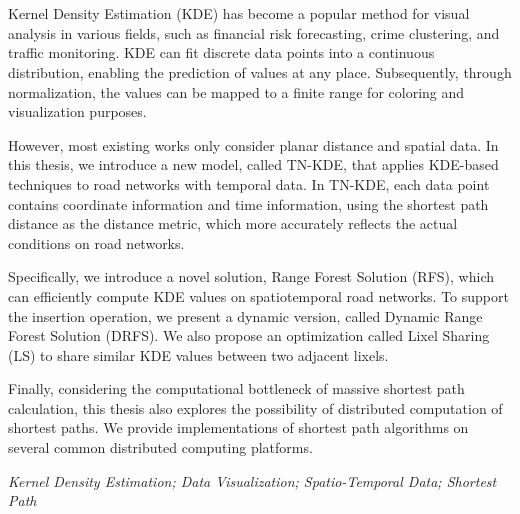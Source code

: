 \newpage
\vspace{-1cm}
\chapter*{\xiaosan {}}
\vspace{-0.5cm}

Kernel Density Estimation (KDE) has become a popular method for visual analysis in various fields, such as financial risk forecasting, crime clustering, and traffic monitoring.
KDE can fit discrete data points into a continuous distribution, enabling the prediction of values at any place. Subsequently, through normalization, the values can be mapped to a finite range for coloring and visualization purposes.

However, most existing works only consider planar distance and spatial data. In this thesis, we introduce a new model, called TN-KDE, that applies KDE-based techniques to road networks with temporal data. In TN-KDE, each data point contains coordinate information and time information, using the shortest path distance as the distance metric, which more accurately reflects the actual conditions on road networks.

Specifically, we introduce a novel solution, Range Forest Solution (RFS), which can efficiently compute KDE values on spatiotemporal road networks. To support the insertion operation, we present a dynamic version, called Dynamic Range Forest Solution (DRFS). We also propose an optimization called Lixel Sharing (LS) to share similar KDE values between two adjacent lixels.

Finally, considering the computational bottleneck of massive shortest path calculation, this thesis also explores the possibility of distributed computation of shortest paths. We provide implementations of shortest path algorithms on several common distributed computing platforms.

\hspace{-0.5cm}
{}
\textit{Kernel Density Estimation; Data Visualization; Spatio-Temporal Data; Shortest Path}